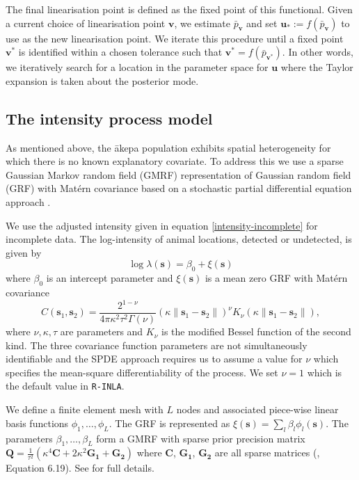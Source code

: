 \documentclass{statsoc}
\newcommand{\bs}{\mathbf{s}}
\newcommand{\bm}{\boldsymbol}  %
\newcommand{\akepa}{\textquotesingle\={a}kepa}  %
\begin{document}
The final linearisation point is defined as the fixed point of this functional.  Given a current choice of linearisation point $\bm{v}$, we estimate $\bar{p}_{\bm{v}}$ and set $\bm{u}_* :=f(\bar{p}_{\bm{v}})$ to use as the new linearisation point.  We iterate this procedure until a fixed point $\bm{v}^*$ is identified within a chosen tolerance such that $\bm{v}^* = f(\bar{p}_{\bm{v}^*})$.  In other words, we iteratively search for a location in the parameter space for $\bm{u}$ where the Taylor expansion is taken about the posterior mode.  

\subsection{The intensity process model}
\label{sec-gmrf}

As mentioned above, the \akepa{} population exhibits spatial heterogeneity for which there is no known explanatory covariate.  To address this we use a sparse Gaussian Markov random field (GMRF) representation of Gaussian random field (GRF) with Mat\'ern covariance based on a stochastic partial differential equation approach \citep{lindgren_explicit_2011}.  

We use the adjusted intensity given in equation \eqref{intensity-incomplete} for incomplete data.  The log-intensity of animal locations, detected or undetected, is given by
\begin{equation*}
\log \lambda(\bs) = \beta_0 + \xi(\bs)
\end{equation*}
where $\beta_0$ is an intercept parameter and $\xi(\bs)$ is a mean zero GRF with Mat\'ern covariance
\begin{equation}
C(\bs_1,\bs_2) = \frac{2^{1-\nu}}{4\pi\kappa^2\tau^2\Gamma(\nu)}(\kappa \|\bs_1-\bs_2\|)^{\nu}K_\nu(\kappa \|\bs_1-\bs_2\|),
\end{equation}
where \(\nu, \kappa, \tau\) are parameters and \(K_{\nu}\) is the modified Bessel function of the second kind.  The three covariance function parameters are not simultaneously identifiable \citep{zhang_inconsistent_2004} and the SPDE approach requires us to assume a value for $\nu$ which specifies the mean-square differentiability of the process.  We set $\nu = 1$ which is the default value in \texttt{R-INLA}.

We define a finite element mesh with $L$ nodes and associated piece-wise linear basis functions $\phi_1, \ldots, \phi_L$. The GRF is represented as $\xi(\bs) = \sum_l \beta_l \phi_l(\bs)$.  The parameters $\beta_1, \ldots, \beta_L$ form a GMRF with sparse prior precision matrix $\bm{Q} = \frac{1}{\tau^2}\left(\kappa^4\bm{C} + 2\kappa^2\bm{G_1} + \bm{G_2}\right)$ where $\bm{C}$, $\bm{G_1}$, $\bm{G_2}$ are all sparse matrices (\cite{blangiardo_spatial_2013}, Equation 6.19). See \cite{lindgren_explicit_2011} for full details. 
\end{document}
